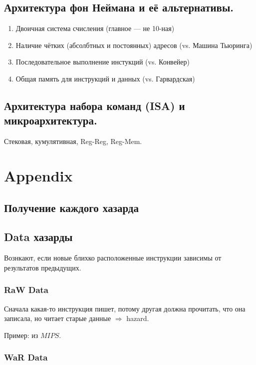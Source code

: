 \documentclass[12pt, a4paper]{article}
\begin{document}
\subsection{Архитектура фон Неймана и её альтернативы.}

\begin{enumerate}
    \item Двоичная система счисления (главное — не 10-ная)
    \item Наличие чётких (абсолбтных и постоянных) адресов (vs. Машина Тьюринга)
    \item Последовательное выполнение инстукций (vs. Конвейер)
    \item Общая память для инструкций и данных (vs. Гарвардская)
\end{enumerate}



\subsection{Архитектура набора команд (ISA) и микроархитектура.}

Стековая, кумулятивная, Reg-Reg, Reg-Mem.




\section{Appendix}

\subsection{Получение каждого хазарда}

\subsection{Data хазарды}

Вознкают, если новые блихко расположенные инструкции зависимы от результатов предыдущих.

\subsubsection{RaW Data}

Сначала какая-то инструкция пишет, потому другая должна прочитать, что она записала, но читает старые данные $\Rightarrow$ hazard.

Пример: из $MIPS$.



\subsubsection{WaR Data}
\end{document}
